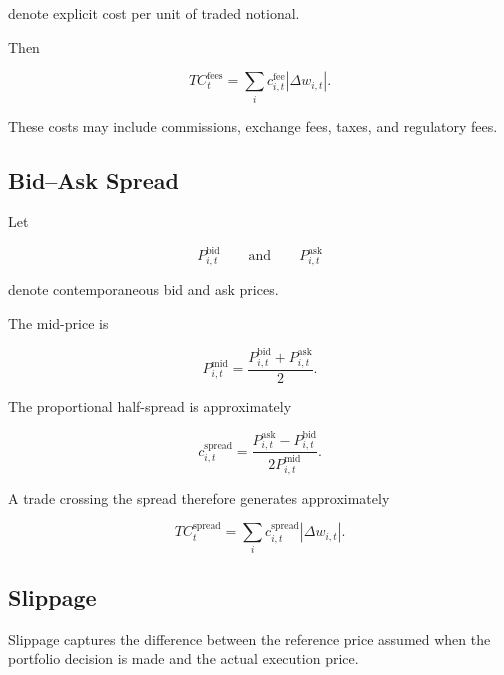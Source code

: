 \documentclass[11pt,a4paper]{article}
\begin{document}
denote explicit cost per unit of traded notional.

Then

\begin{equation}
\boxed{
TC_t^{\mathrm{fees}}
=
\sum_i
c_{i,t}^{\mathrm{fee}}
|\Delta w_{i,t}|.
}
\end{equation}

These costs may include commissions, exchange fees, taxes, and regulatory fees.


\subsection{Bid--Ask Spread}

Let

\begin{equation}
P_{i,t}^{\mathrm{bid}}
\qquad\text{and}\qquad
P_{i,t}^{\mathrm{ask}}
\end{equation}

denote contemporaneous bid and ask prices.

The mid-price is

\begin{equation}
P_{i,t}^{\mathrm{mid}}
=
\frac{
P_{i,t}^{\mathrm{bid}}
+
P_{i,t}^{\mathrm{ask}}
}{2}.
\end{equation}

The proportional half-spread is approximately

\begin{equation}
\boxed{
c_{i,t}^{\mathrm{spread}}
=
\frac{
P_{i,t}^{\mathrm{ask}}
-
P_{i,t}^{\mathrm{bid}}
}{
2P_{i,t}^{\mathrm{mid}}
}.
}
\end{equation}

A trade crossing the spread therefore generates approximately

\begin{equation}
TC_t^{\mathrm{spread}}
=
\sum_i
c_{i,t}^{\mathrm{spread}}
|\Delta w_{i,t}|.
\end{equation}


\subsection{Slippage}

Slippage captures the difference between the reference price assumed when the
portfolio decision is made and the actual execution price.
\end{document}
